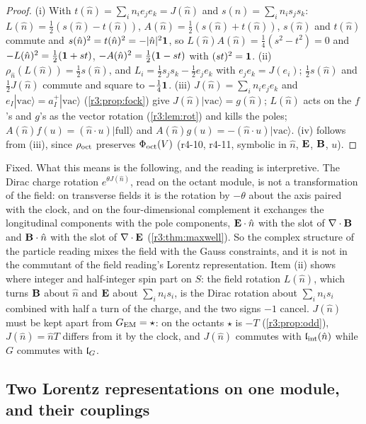 \begin{proof}
(i) With $t(\hat n)=\sum_in_ie_je_k=J(\hat n)$ and $s(\hat n)=\sum_in_is_js_k$: $L(\hat n)=\tfrac12(s(\hat n)-t(\hat n))$, $A(\hat n)=\tfrac12(s(\hat n)+t(\hat n))$, $s(\hat n)$ and $t(\hat n)$ commute and
$s(\hat n)^2=t(\hat n)^2=-|\hat n|^2\mathbf 1$, so $L(\hat n)A(\hat n)=\tfrac14(s^2-t^2)=0$ and $-L(\hat n)^2=\tfrac12(\mathbf 1+st)$, $-A(\hat n)^2=\tfrac12(\mathbf 1-st)$ with $(st)^2=\mathbf 1$. (ii) $\rho_{\hat n}(L(\hat n))=\tfrac12s(\hat n)$,
and $L_i=\tfrac12s_js_k-\tfrac12e_je_k$ with $e_je_k=J(e_i)$; $\tfrac12s(\hat n)$ and $\tfrac12J(\hat n)$ commute and square to $-\tfrac14\mathbf 1$. (iii) $J(\hat n)=\sum_in_ie_je_k$ and $e_I|\mathrm{vac}\rangle=a^+_I|\mathrm{vac}\rangle$
(\cref{r3:prop:fock}) give $J(\hat n)|\mathrm{vac}\rangle=g(\hat n)$; $L(\hat n)$ acts on the $f$'s and $g$'s as the vector rotation (\cref{r3:lem:rot}) and kills the poles; $A(\hat n)f(u)=(\hat n\cdot u)|\mathrm{full}\rangle$
and $A(\hat n)g(u)=-(\hat n\cdot u)|\mathrm{vac}\rangle$. (iv) follows from (iii), since $\rho_{\rm oct}$ preserves $\Phi_{\rm oct}(V)$ (r4-10, r4-11, symbolic in $\hat n$, $\mathbf E$, $\mathbf B$, $u$).
\end{proof}

Fixed. What this means is the following, and the reading is interpretive. The Dirac charge rotation $e^{\theta J(\hat n)}$, read on the octant module, is not
a transformation of the field: on transverse fields it is the rotation by $-\theta$ about the axis paired with the clock, and on the four-dimensional
complement it exchanges the longitudinal components with the pole components, $\mathbf E\cdot \hat n$ with the slot of $\nabla\cdot\mathbf B$ and $\mathbf B\cdot \hat n$ with the slot of
$\nabla\cdot\mathbf E$ (\cref{r3:thm:maxwell}). So the complex structure of the particle reading mixes the field with the Gauss constraints, and it is not in
the commutant of the field reading's Lorentz representation. Item (ii) shows where integer and half-integer spin part on $S$: the field rotation
$L(\hat n)$, which turns $\mathbf B$ about $\hat n$ and $\mathbf E$ about $\sum_in_is_i$, is the Dirac rotation about $\sum_in_is_i$ combined with half a turn of the charge,
and the two signs $-1$ cancel. $J(\hat n)$ must be kept apart from $G_{\rm EM}=\star$: on the octants $\star$ is $-T$ (\cref{r3:prop:odd}), $J(\hat n)=\hat nT$ differs from it by
the clock, and $J(\hat n)$ commutes with $\mathfrak l_{\rm int}(\hat n)$ while $G$ commutes with $\mathfrak l_G$.

\subsection{Two Lorentz representations on one module, and their couplings}
\label{r4:sec:reps}

